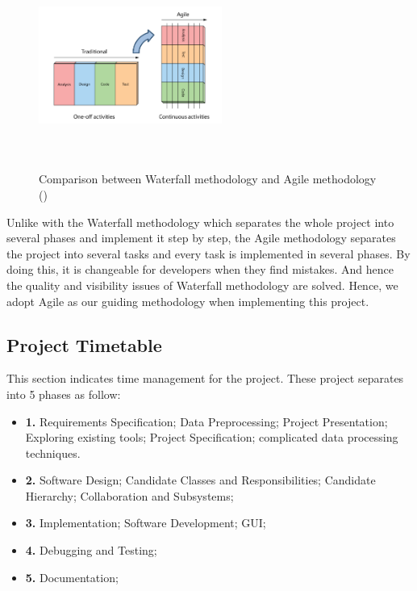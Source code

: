 \begin{figure}[H]
	\centering	
	\includegraphics[width=6cm, height=6cm]{Figs/Waterfull-Agile}\\[1ex]
	\caption{Comparison between Waterfall methodology and Agile methodology (\cite{Agile vs Waterfall})}
	\label{fig:waterfallAgile}
\end{figure}

Unlike with the Waterfall methodology which separates the whole project into several phases and implement it step by step, the Agile methodology separates the project into several tasks and every task is implemented in several phases. By doing this, it is changeable for developers when they find mistakes. And hence the quality and visibility issues of Waterfall methodology are solved. Hence, we adopt Agile as our guiding methodology when implementing this project.

\subsection{Project Timetable}

This section indicates time management for the project. These project separates into 5 phases \cite{Laramee} as follow:

\begin{itemize}
	\item \textbf{1. }Requirements Specification; 
	Data Preprocessing; 
	Project Presentation;
	Exploring existing tools; 
	Project Specification; 
	 complicated data processing techniques.
	\item \textbf{2. }Software Design;
	Candidate Classes and Responsibilities;
	Candidate Hierarchy;
	Collaboration and Subsystems;
	\item \textbf{3. }Implementation;
	Software Development;
	GUI;
	\item \textbf{4. }Debugging and Testing;
	\item \textbf{5. }Documentation;
\end{itemize}

